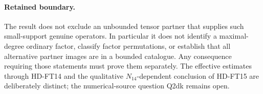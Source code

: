 \paragraph{Retained boundary.}
The result does not exclude an unbounded tensor partner that supplies
such small-support genuine operators.  In particular it does not
identify a maximal-degree ordinary factor, classify factor permutations,
or establish that all alternative partner images are in a bounded
catalogue.  Any consequence requiring those statements must prove them
separately.  The effective estimates through HD-FT14 and the qualitative
\(N_{14}\)-dependent conclusion of HD-FT15 are deliberately distinct;
the numerical-source question Q2dk remains open.
